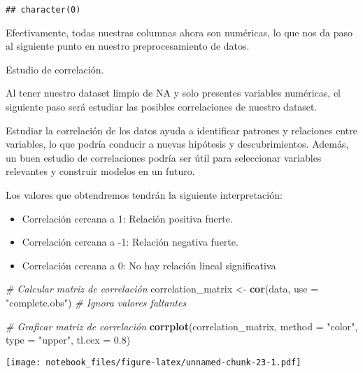 \documentclass[
]{article}
\newenvironment{Shaded}{\begin{snugshade}}{\end{snugshade}}
\newcommand{\AttributeTok}[1]{\textcolor[rgb]{0.13,0.29,0.53}{#1}}
\newcommand{\CommentTok}[1]{\textcolor[rgb]{0.56,0.35,0.01}{\textit{#1}}}
\newcommand{\FloatTok}[1]{\textcolor[rgb]{0.00,0.00,0.81}{#1}}
\newcommand{\FunctionTok}[1]{\textcolor[rgb]{0.13,0.29,0.53}{\textbf{#1}}}
\newcommand{\NormalTok}[1]{#1}
\newcommand{\OtherTok}[1]{\textcolor[rgb]{0.56,0.35,0.01}{#1}}
\newcommand{\StringTok}[1]{\textcolor[rgb]{0.31,0.60,0.02}{#1}}
\providecommand{\tightlist}{%
  \setlength{\itemsep}{0pt}\setlength{\parskip}{0pt}}
\begin{document}
\begin{verbatim}
## character(0)
\end{verbatim}

Efectivamente, todas nuestras columnas ahora son numéricas, lo que nos
da paso al siguiente punto en nuestro preprocesamiento de datos.

Estudio de correlación.

Al tener nuestro dataset limpio de NA y solo presentes variables
numéricas, el siguiente paso será estudiar las posibles correlaciones de
nuestro dataset.

Estudiar la correlación de los datos ayuda a identificar patrones y
relaciones entre variables, lo que podría conducir a nuevas hipótesis y
descubrimientos. Además, un buen estudio de correlaciones podría ser
útil para seleccionar variables relevantes y construir modelos en un
futuro.

Los valores que obtendremos tendrán la siguiente interpretación:

\begin{itemize}
\tightlist
\item
  Correlación cercana a 1: Relación positiva fuerte.
\item
  Correlación cercana a -1: Relación negativa fuerte.
\item
  Correlación cercana a 0: No hay relación lineal significativa
\end{itemize}

\begin{Shaded}
\begin{Highlighting}[]
\CommentTok{\# Calcular matriz de correlación}
\NormalTok{correlation\_matrix }\OtherTok{\textless{}{-}} \FunctionTok{cor}\NormalTok{(data, }\AttributeTok{use =} \StringTok{"complete.obs"}\NormalTok{)  }\CommentTok{\# Ignora valores faltantes}


\CommentTok{\# Graficar matriz de correlación}
\FunctionTok{corrplot}\NormalTok{(correlation\_matrix, }\AttributeTok{method =} \StringTok{"color"}\NormalTok{, }\AttributeTok{type =} \StringTok{"upper"}\NormalTok{, }\AttributeTok{tl.cex =} \FloatTok{0.8}\NormalTok{)}
\end{Highlighting}
\end{Shaded}

\texttt{[image: notebook\_files/figure-latex/unnamed-chunk-23-1.pdf]}
\end{document}

